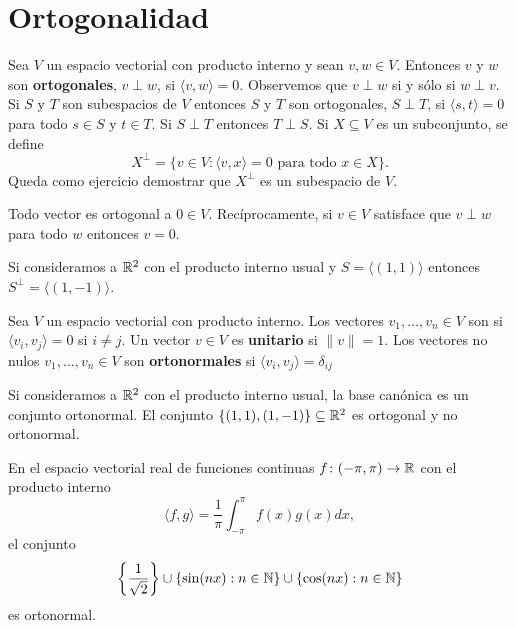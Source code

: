 \section{Ortogonalidad}

\begin{block}
    Sea $V$ un espacio vectorial con producto interno y sean $v,w\in V$.
    Entonces $v$ y $w$ son \textbf{ortogonales}, $v\perp w$, si $\langle
    v,w\rangle=0$. Observemos que $v\perp w$ si y sólo si $w\perp v$. Si $S$ y
    $T$ son subespacios de $V$ entonces $S$ y $T$ son ortogonales, $S\perp T$,
    si $\langle s,t\rangle=0$ para todo $s\in S$ y $t\in T$. Si $S\perp T$
    entonces $T\perp S$. Si $X\subseteq V$ es un subconjunto, se define
	\[
		X^\perp=\{v\in V:\langle v,x\rangle=0\text{ para todo $x\in X$}\}.
	\]
	Queda como ejercicio demostrar que $X^\perp$ es un subespacio de $V$. 
\end{block}

\begin{example}
    Todo vector es ortogonal a $0\in V$. Recíprocamente, si $v\in V$ satisface
    que $v\perp w$ para todo $w$ entonces $v=0$.
\end{example}

\begin{example}
    Si consideramos a $\mathbb{R}^2$ con el producto interno usual y $S=\langle
    (1,1)\rangle$ entonces $S^\perp=\langle (1,-1)\rangle$. 
\end{example}

\begin{block}
	Sea $V$ un espacio vectorial con producto interno. Los vectores 
	$v_1,\dots,v_n\in V$ son  si $\langle v_i,v_j\rangle=0$
	si $i\ne j$. Un vector $v\in V$ es \textbf{unitario} si $\|v\|=1$. Los vectores 
	no nulos $v_1,\dots,v_n\in V$ son \textbf{ortonormales} si $\langle
	v_i,v_j\rangle=\delta_{ij}$
\end{block}

\begin{examples}
    Si consideramos a $\mathbb{R}^2$ con el producto interno usual, la base canónica es
    un conjunto ortonormal.  El conjunto $\{(1,1),(1,-1)\}\subseteq\mathbb{R}^2$ es
    ortogonal y no ortonormal. 
\end{examples}

\begin{example}
	En el espacio vectorial real de funciones continuas
	$f\colon(-\pi,\pi)\to\mathbb{R}$ con el producto interno 
	\[
		\langle f,g\rangle=\frac1\pi\int_{-\pi}^\pi f(x)g(x)dx,
	\]
	el conjunto
	\[
	\left\{\frac{1}{\sqrt{2}}\right\}\cup\{\sin(nx):n\in\mathbb{N}\}\cup\{\cos(nx):n\in\mathbb{N}\}
	\]
	es ortonormal.
\end{example}

